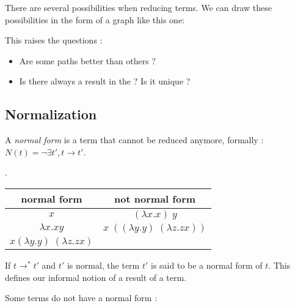   There are several possibilities when reducing terms. We can draw these
  possibilities in the form of a graph like this one:

  \begin{center}
  \end{center}

  This raises the questions : \begin{itemize}
    \item Are some paths better than others ?
    \item Is there always a result in the ? Is it unique ?
  \end{itemize}

  \subsection{Normalization}

  A \textit{normal form} is a term that cannot be reduced anymore,
  formally : $N(t) = \neg \exists t', t \to t' $.

  \exam.

  \begin{tabular}{c|c}
    normal form & not normal form \\
    \hline
    $x$ & $(\lambda x.x)\; y$ \\
    $\lambda x.xy$ & $x\; ((\lambda y.y)\;(\lambda z.zx))$ \\
    $x (\lambda y.y)\;(\lambda z.zx)$ &
  \end{tabular}

  \vspace{0.5cm}

  If $t\to^* t'$ and $t'$ is normal, the term $t'$ is said to be a normal form
  of $t$. This defines our informal notion of a result of a term.

  Some terms do not have a normal form :

